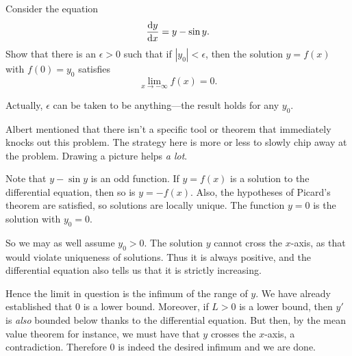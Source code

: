 \begin{problem}
	Consider the equation
	\[
		\deriv[x][y] = y -\sin y.
	\]
	Show that there is an $\epsilon >0$ such that if $|y_0|<\epsilon$, then the solution $y = f(x)$ with $f(0) = y_0$ satisfies
	\[
		\lim_{x\to -\infty} f(x) = 0.
	\]
\end{problem}
\begin{solution}
	Actually, $\epsilon$ can be taken to be anything---the result holds for any $y_0$.
	
	Albert mentioned that there isn't a specific tool or theorem that immediately knocks out this problem. The strategy here is more or less to slowly chip away at the problem. Drawing a picture helps \emph{a lot}.
	
	Note that $y - \sin y$ is an odd function. If $y=f(x)$ is a solution to the differential equation, then so is $y = -f(x)$. Also, the hypotheses of Picard's theorem are satisfied, so solutions are locally unique. The function $y=0$ is the solution with $y_0 = 0$.
	
	So we may as well assume $y_0 > 0$. The solution $y$ cannot cross the $x$-axis, as that would violate uniqueness of solutions. Thus it is always positive, and the differential equation also tells us that it is strictly increasing.
	
	Hence the limit in question is the infimum of the range of $y$. We have already established that 0 is a lower bound. Moreover, if $L > 0$ is a lower bound, then $y'$ is \emph{also} bounded below thanks to the differential equation. But then, by the mean value theorem for instance, we must have that $y$ crosses the $x$-axis, a contradiction. Therefore 0 is indeed the desired infimum and we are done.
\end{solution}